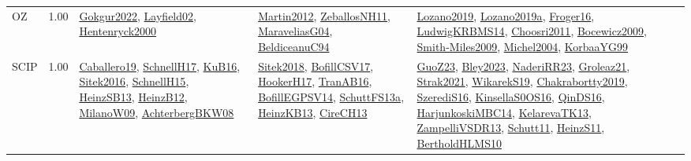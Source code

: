 {\begin{longtable}{p{3cm}r>{\raggedright\arraybackslash}p{6cm}>{\raggedright\arraybackslash}p{6cm}>{\raggedright\arraybackslash}p{8cm}}
\index{OZ}\index{CPSystems!OZ}OZ &  1.00 & \hyperref[detail:Gokgur2022]{Gokgur2022}, \hyperref[detail:Layfield02]{Layfield02}, \hyperref[detail:Hentenryck2000]{Hentenryck2000} & \hyperref[detail:Martin2012]{Martin2012}, \hyperref[detail:ZeballosNH11]{ZeballosNH11}, \hyperref[detail:MaraveliasG04]{MaraveliasG04}, \hyperref[detail:BeldiceanuC94]{BeldiceanuC94} & \hyperref[detail:Lozano2019]{Lozano2019}, \hyperref[detail:Lozano2019a]{Lozano2019a}, \hyperref[detail:Froger16]{Froger16}, \hyperref[detail:LudwigKRBMS14]{LudwigKRBMS14}, \hyperref[detail:Choosri2011]{Choosri2011}, \hyperref[detail:Bocewicz2009]{Bocewicz2009}, \hyperref[detail:Smith-Miles2009]{Smith-Miles2009}, \hyperref[detail:Michel2004]{Michel2004}, \hyperref[detail:KorbaaYG99]{KorbaaYG99}\\
\index{SCIP}\index{CPSystems!SCIP}SCIP &  1.00 & \hyperref[detail:Caballero19]{Caballero19}, \hyperref[detail:SchnellH17]{SchnellH17}, \hyperref[detail:KuB16]{KuB16}, \hyperref[detail:Sitek2016]{Sitek2016}, \hyperref[detail:SchnellH15]{SchnellH15}, \hyperref[detail:HeinzSB13]{HeinzSB13}, \hyperref[detail:HeinzB12]{HeinzB12}, \hyperref[detail:MilanoW09]{MilanoW09}, \hyperref[detail:AchterbergBKW08]{AchterbergBKW08} & \hyperref[detail:Sitek2018]{Sitek2018}, \hyperref[detail:BofillCSV17]{BofillCSV17}, \hyperref[detail:HookerH17]{HookerH17}, \hyperref[detail:TranAB16]{TranAB16}, \hyperref[detail:BofillEGPSV14]{BofillEGPSV14}, \hyperref[detail:SchuttFS13a]{SchuttFS13a}, \hyperref[detail:HeinzKB13]{HeinzKB13}, \hyperref[detail:CireCH13]{CireCH13} & \hyperref[detail:GuoZ23]{GuoZ23}, \hyperref[detail:Bley2023]{Bley2023}, \hyperref[detail:NaderiRR23]{NaderiRR23}, \hyperref[detail:Groleaz21]{Groleaz21}, \hyperref[detail:Strak2021]{Strak2021}, \hyperref[detail:WikarekS19]{WikarekS19}, \hyperref[detail:Chakrabortty2019]{Chakrabortty2019}, \hyperref[detail:SzerediS16]{SzerediS16}, \hyperref[detail:KinsellaS0OS16]{KinsellaS0OS16}, \hyperref[detail:QinDS16]{QinDS16}, \hyperref[detail:HarjunkoskiMBC14]{HarjunkoskiMBC14}, \hyperref[detail:KelarevaTK13]{KelarevaTK13}, \hyperref[detail:ZampelliVSDR13]{ZampelliVSDR13}, \hyperref[detail:Schutt11]{Schutt11}, \hyperref[detail:HeinzS11]{HeinzS11}, \hyperref[detail:BertholdHLMS10]{BertholdHLMS10}\\

\end{longtable}}
